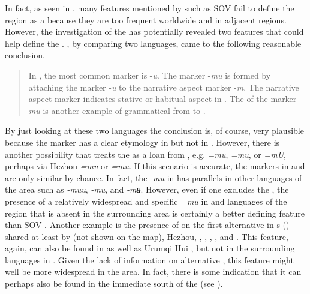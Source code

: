 \noindent In fact, as seen in , many features mentioned by \cite[180ff.]{Janhunen2012a} such as SOV  fail to define the region as a  because they are too frequent worldwide and in adjacent regions. However, the investigation of the  has potentially revealed two features that could help define the . \citet[384]{Sandman2012}, by comparing two languages, came to the following reasonable conclusion.

\begin{quote}
In , the most common  marker is -\textit{u}. The  marker {}-\textit{mu} is formed by attaching the  marker -\textit{u} to the narrative aspect marker -\textit{m}. The narrative aspect marker indicates stative or habitual aspect in . The  of the  marker -\textit{mu} is another example of grammatical  from  to .
\end{quote}

By just looking at these two languages the conclusion is, of course, very plausible because the marker has a clear etymology in  but not in . However, there is another possibility that treats the   as a loan from , e.g.  \textit{=mu},  \textit{=mu}, or  \textit{=mU}, perhaps via Hezhou  \textit{=mu} or  \textit{=mu}. If this scenario is accurate, the markers in  and  are only similar by chance. In fact, the  \textit{{}-mu} in  has parallels in other  languages of the area such as  \textit{{}-muu},  \textit{{}-mu}, and  \textit{{}-mʉ}. However, even if one excludes the  , the presence of a relatively widespread and specific  \textit{=mu} in  and  languages of the region that is absent in the surrounding area is certainly a better defining feature than SOV . Another example is the presence of  on the first alternative in s () shared at least by  (not shown on the map), Hezhou, , , , , and . This feature, again, can also be found in  as well as Urumqi Hui , but not in the surrounding languages in . Given the lack of information on alternative , this feature might well be more widespread in the area. In fact, there is some indication that it can perhaps also be found in the immediate south of the  (see ).

